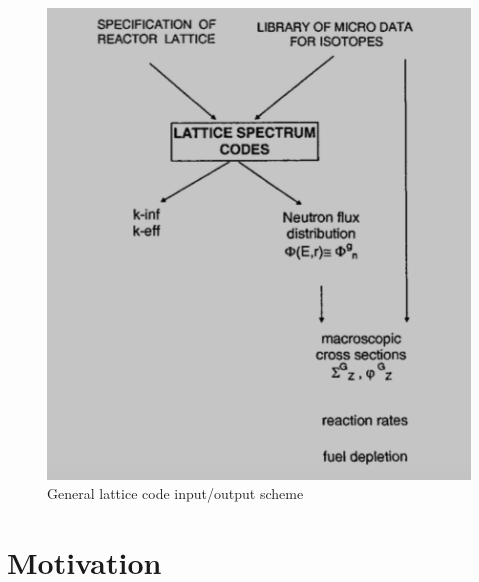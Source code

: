\documentclass[12pt]{article}
\begin{document}
\begin{figure} [htb!]
\centering
\includegraphics[scale=0.4]{Figures/Lattice code diagram.png} 
\caption{General lattice code input/output scheme}
\end{figure}

\section{Motivation}
\end{document}
